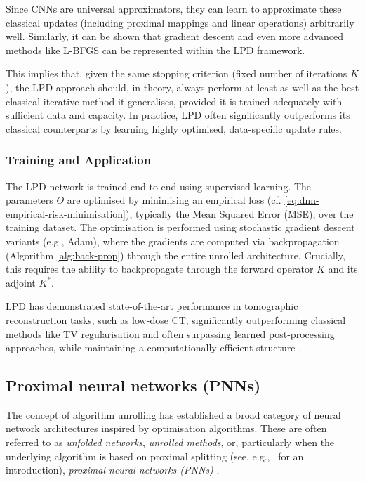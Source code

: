 Since CNNs are universal approximators, they can learn to approximate these classical updates (including proximal mappings and linear operations) arbitrarily well. Similarly, it can be shown that gradient descent and even more advanced methods like L-BFGS can be represented within the LPD framework.

This implies that, given the same stopping criterion (fixed number of iterations $K$), the LPD approach should, in theory, always perform at least as well as the best classical iterative method it generalises, provided it is trained adequately with sufficient data and capacity. In practice, LPD often significantly outperforms its classical counterparts by learning highly optimised, data-specific update rules.

\subsubsection{Training and Application}

The LPD network is trained end-to-end using supervised learning. The parameters $\Theta$ are optimised by minimising an empirical loss (cf. \eqref{eq:dnn-empirical-risk-minimisation}), typically the Mean Squared Error (MSE), over the training dataset. The optimisation is performed using stochastic gradient descent variants (e.g., Adam), where the gradients are computed via backpropagation (Algorithm \ref{alg:back-prop}) through the entire unrolled architecture. Crucially, this requires the ability to backpropagate through the forward operator $K$ and its adjoint $K^*$.

LPD has demonstrated state-of-the-art performance in tomographic reconstruction tasks, such as low-dose CT, significantly outperforming classical methods like TV regularisation and often surpassing learned post-processing approaches, while maintaining a computationally efficient structure \cite{adler2018learned}.

\subsection{Proximal neural networks (PNNs)}

The concept of algorithm unrolling has established a broad category of neural network architectures inspired by optimisation algorithms. These are often referred to as \emph{unfolded networks}, \emph{unrolled methods}, or, particularly when the underlying algorithm is based on proximal splitting (see, e.g.,~\cite{combettes2011proximal} for an introduction), \emph{proximal neural networks (PNNs)} \cite{gregor2010learning, adler2017solving, adler2018learned, jiu2021deep, monga2021algorithm, le2022faster, le2023pnn, mardani2018neural, wang2025unrolling}.

